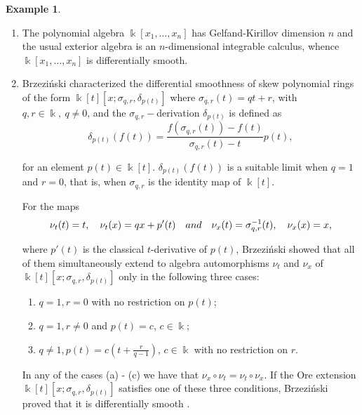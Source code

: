\documentclass{amsart}
\theoremstyle{definition}
\newtheorem{example}[theorem]{Example}
\theoremstyle{remark}
\numberwithin{equation}{section}
\begin{document}
\begin{example}\label{Brzezinski2015DSOEbiquadratic}
\begin{enumerate}
    \item [\rm (i)] The polynomial algebra $\Bbbk[x_1, \dotsc, x_n]$ has Gelfand-Kirillov dimension $n$ and the usual exterior algebra is an $n$-dimensional integrable calculus, whence $\Bbbk[x_1, \dotsc, x_n]$ is differentially smooth.

    \item [\rm (ii)] Brzezi{\'n}ski \cite{Brzezinski2015} characterized the differential smoothness of skew polynomial rings of the form $\Bbbk[t][x; \sigma_{q, r}, \delta_{p(t)}]$ where $\sigma_{q, r}(t) = qt + r$, with $q, r \in \Bbbk,\ q\neq 0$, and the $\sigma_{q, r}-$derivation $\delta_{p(t)}$ is defined as
\begin{equation}\label{deltap}
\delta_{p(t)} (f(t)) = \frac{f(\sigma_{q, r}(t)) - f(t)}{\sigma_{q, r}(t) - t} p(t),
\end{equation}

for an element $p(t) \in \Bbbk[t]$. $\delta_{p(t)}(f(t))$ is a suitable limit when $q = 1$ and $r = 0$, that is, when $\sigma_{q, r}$ is the identity map of $\Bbbk[t]$.

For the maps
\begin{equation}\label{Brzezinski2015(3.4)1}
\nu_t(t) = t,\quad \nu_t(x) = qx + p'(t)\quad {\rm and}\quad \nu_x(t) = \sigma_{q, r}^{-1}(t),\quad \nu_x(x) = x,
\end{equation}

where $p'(t)$ is the classical $t$-derivative of $p(t)$, Brzezi{\'n}ski \cite[Lemma 3.1]{Brzezinski2015} showed that all of them simultaneously extend to algebra automorphisms $\nu_t$ and $\nu_x$ of $\Bbbk[t][x; \sigma_{q, r}, \delta_{p(t)}]$ only in the following three cases:
    \begin{enumerate}
        \item [\rm (a)] $q = 1, r = 0$ with no restriction on $p(t)$;
        
        \item [\rm (b)] $q = 1, r\neq 0$ and $p(t) = c$, $c\in \Bbbk$;
        
        \item [\rm (c)] $q\neq 1, p(t) = c\left( t + \frac{r}{q-1} \right)$, $c\in \Bbbk$ with no restriction on $r$.
    \end{enumerate}
    
In any of the cases {\rm (a) - (c)} we have that $\nu_x \circ \nu_t = \nu_t \circ \nu_x$. If the Ore extension $\Bbbk[t][x; \sigma_{q, r}, \delta_{p(t)}]$ satisfies one of these three conditions, Brzezi{\'n}ski proved that it is differentially smooth \cite[Proposition 3.3]{Brzezinski2015}.


\end{enumerate}
\end{example}
\end{document}
